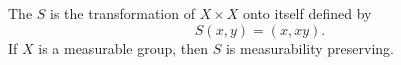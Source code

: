 The  $S$ is the transformation of $X \times X$ onto itself defined by
$$S(x,y) = (x,xy).$$
If $X$ is a measurable group, then $S$ is measurability preserving.
